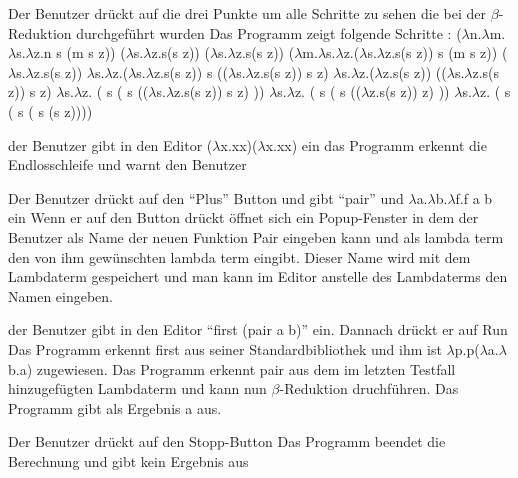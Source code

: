 \documentclass[parskip=full,11pt,twoside]{scrartcl}
\begin{document}
{ Der Benutzer drückt auf die drei Punkte um alle Schritte zu sehen die bei der $\beta$-Reduktion durchgeführt wurden }
{ Das Programm zeigt folgende Schritte :
\newline ($\lambda$n.$\lambda$m.$\lambda$s.$\lambda$z.n s (m s z)) ($\lambda$s.$\lambda$z.s(s z)) ($\lambda$s.$\lambda$z.s(s z))
\newline ($\lambda$m.$\lambda$s.$\lambda$z.($\lambda$s.$\lambda$z.s(s z)) s (m s z)) ($\lambda$s.$\lambda$z.s(s z))
\newline $\lambda$s.$\lambda$z.($\lambda$s.$\lambda$z.s(s z)) s (($\lambda$s.$\lambda$z.s(s z)) s z)
\newline $\lambda$s.$\lambda$z.($\lambda$z.s(s z)) (($\lambda$s.$\lambda$z.s(s z)) s z)
\newline $\lambda$s.$\lambda$z. ( s ( s (($\lambda$s.$\lambda$z.s(s z)) s z) ))
\newline $\lambda$s.$\lambda$z. ( s ( s (($\lambda$z.s(s z)) z) ))
\newline $\lambda$s.$\lambda$z. ( s ( s ( s (s z))))
 }

{der Benutzer gibt in den Editor ($\lambda$x.xx)($\lambda$x.xx) ein }
{ das Programm erkennt die Endlosschleife und warnt den Benutzer }

{ Der Benutzer drückt auf den \enquote {Plus} Button und gibt \enquote {pair} und $\lambda$a.$\lambda$b.$\lambda$f.f a b ein }
{Wenn er auf den Button drückt öffnet sich ein Popup-Fenster in dem der Benutzer als Name der neuen Funktion Pair eingeben kann und als lambda term den von ihm gewünschten lambda term eingibt. Dieser Name wird mit dem Lambdaterm gespeichert und man kann im Editor anstelle des Lambdaterms den Namen eingeben. }

{ der Benutzer gibt in den Editor \enquote {first (pair a b)} ein. Dannach drückt er auf Run}
{ Das Programm erkennt first aus seiner Standardbibliothek und ihm ist $\lambda$p.p($\lambda$a.$\lambda$b.a) zugewiesen. Das Programm erkennt pair aus dem im letzten Testfall hinzugefügten Lambdaterm und kann nun $\beta$-Reduktion druchführen. Das Programm gibt als Ergebnis a aus.}

{Der Benutzer drückt auf den Stopp-Button}
{ Das Programm beendet die Berechnung und gibt kein Ergebnis aus }
\end{document}
